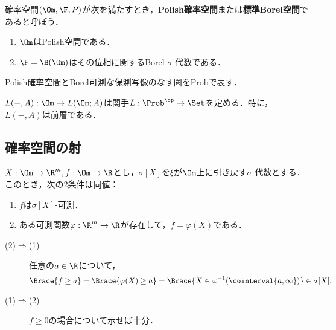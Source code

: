 \documentclass[uplatex,dvipdfmx]{jsreport}
\begin{document}
\begin{definition}
    確率空間$(\Om,\F,P)$が次を満たすとき，\textbf{Polish確率空間}または\textbf{標準Borel空間}であると呼ぼう．
    \begin{enumerate}
        \item $\Om$はPolish空間である．
        \item $\F=\B(\Om)$はその位相に関するBorel $\sigma$-代数である．
    \end{enumerate}
    Polish確率空間とBorel可測な保測写像のなす圏をProbで表す．
\end{definition}

\begin{proposition}
    $L(-,A):\Om\mapsto L(\Om;A)$は関手$L:\Prob^\op\to\Set$を定める．特に，$L(-,A)$は前層である．
\end{proposition}

\subsection{確率空間の射}

\begin{theorem}
    $X:\Om\to\R^m,f:\Om\to\R$とし，$\sigma[X]$を$\xi$が$\Om$上に引き戻す$\sigma$-代数とする．
    このとき，次の2条件は同値：
    \begin{enumerate}
        \item $f$は$\sigma[X]$-可測．
        \item ある可測関数$\varphi:\R^m\to\R$が存在して，$f=\varphi(X)$である．
    \end{enumerate}
\end{theorem}
\begin{Proof}\mbox{}
    \begin{description}
        \item[(2)$\Rightarrow$(1)] 任意の$a\in\R$について，
        \[\Brace{f\ge a}=\Brace{\varphi(X)\ge a}=\Brace{X\in\varphi^{-1}(\cointerval{a,\infty})}\in\sigma[X].\]
        \item[(1)$\Rightarrow$(2)] $f\ge0$の場合について示せば十分．
        
    \end{description}
\end{Proof}
\end{document}
